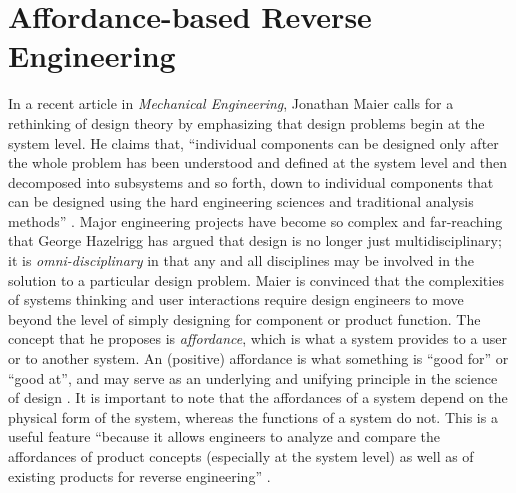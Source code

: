 \section{Affordance-based Reverse Engineering}

In a recent article in \textit{Mechanical Engineering}, Jonathan Maier
calls for a rethinking of design theory by emphasizing that design
problems begin at the system level. He claims that, “individual
components can be designed only after the whole problem has been
understood and defined at the system level and then decomposed into
subsystems and so forth, down to individual components that can be
designed using the hard engineering sciences and traditional analysis
methods” \citep[pg. 34]{maier2008}\citep{maier2011}. Major engineering projects have become so
complex and far-reaching that George Hazelrigg has argued that design
is no longer just multidisciplinary; it is \textit{omni-disciplinary}
in that any and all disciplines may be involved in the solution to a
particular design problem.\citep{hazelrigg1996} Maier is convinced that
the complexities of systems thinking and user interactions require
design engineers to move beyond the level of simply designing for
component or product function. The concept that he proposes is
\textit{affordance}, which is what a system provides to a user or to
another system. An (positive) affordance is what something is “good
for” or “good at”, and may serve as an underlying and unifying
principle in the science of design \citep{maierfadel2001}. It is important
to note that the affordances of a system depend on the physical form of
the system, whereas the functions of a system do not. This is a useful
feature “because it allows engineers to analyze and compare the
affordances of product concepts (especially at the system level) as
well as of existing products for reverse
engineering” \citep[][pg. 36]{maier2008}.

